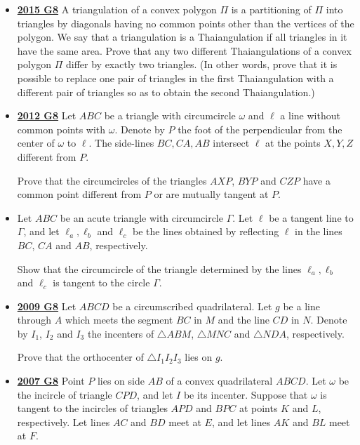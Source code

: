 \documentclass[11pt]{scrartcl}
\begin{document}
\begin{itemize}[leftmargin=*]
Show that \[AH + BH + CH \geqslant  AI + BI + CI.\]
\item \href{https://artofproblemsolving.com/community/c6h1268911p6622814}{\textbf{2015 G8}} 	A triangulation of a convex polygon $\Pi$ is a partitioning of $\Pi$ into triangles by diagonals having no common points other than the vertices of the polygon. We say that a triangulation is a Thaiangulation if all triangles in it have the same area. Prove that any two different Thaiangulations of a convex polygon $\Pi$ differ by exactly two triangles. (In other words, prove that it is possible to replace one pair of triangles in the first Thaiangulation with a different pair of triangles so as to obtain the second Thaiangulation.)
\item \href{https://artofproblemsolving.com/community/c6h546185p3160596}{\textbf{2012 G8}} Let $ABC$ be a triangle with circumcircle $\omega$ and $\ell$ a line without common points with $\omega$. Denote by $P$ the foot of the perpendicular from the center of $\omega$ to $\ell$. The side-lines $BC,CA,AB$ intersect $\ell$ at the points $X,Y,Z$ different from $P$. 

Prove that the circumcircles of the triangles $AXP$, $BYP$ and $CZP$ have a common point different from $P$ or are mutually tangent at $P$.
\item {}  Let $ABC$ be an acute triangle with circumcircle $\Gamma$. Let $\ell$ be a tangent line to $\Gamma$, and let $\ell_a, \ell_b$ and $\ell_c$ be the lines obtained by reflecting $\ell$ in the lines $BC$, $CA$ and $AB$, respectively. 

Show that the circumcircle of the triangle determined by the lines $\ell_a, \ell_b$ and $\ell_c$ is tangent to the circle $\Gamma$.

\item \href{https://artofproblemsolving.com/community/c6h355795p1932940}{\textbf{2009 G8}} Let $ABCD$ be a circumscribed quadrilateral. Let $g$ be a line through $A$ which meets the segment $BC$ in $M$ and the line $CD$ in $N$. Denote by $I_1$, $I_2$ and $I_3$ the incenters of $\triangle ABM$, $\triangle MNC$ and $\triangle NDA$, respectively. 

Prove that the orthocenter of $\triangle I_1I_2I_3$ lies on $g$.

\item \href{https://artofproblemsolving.com/community/c6h214649p1186805}{\textbf{2007 G8}} Point $ P$ lies on side $ AB$ of a convex quadrilateral $ ABCD$. Let $ \omega$ be the incircle of triangle $ CPD$, and let $ I$ be its incenter. Suppose that $ \omega$ is tangent to the incircles of triangles $ APD$ and $ BPC$ at points $ K$ and $ L$, respectively. Let lines $ AC$ and $ BD$ meet at $ E$, and let lines $ AK$ and $ BL$ meet at $ F$. 


\end{itemize}
\end{document}
